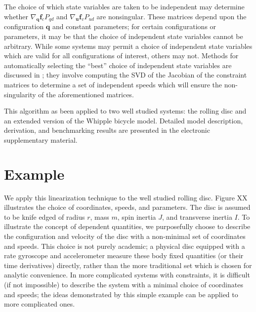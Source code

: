 \documentclass[smallcondensed]{svjour3}                     %
\begin{document}
The choice of which state variables are taken to be independent may determine
whether $\nabla_{\bm{q}}\bm{f}_{c} P_{qd}$ and $\nabla_{\bm{u}} \bm{f}_{v}
P_{ud}$ are nonsingular.  These matrices depend upon the configuration $\bm{q}$
and constant parameters; for certain configurations or parameters, it may be
that the choice of independent state variables cannot be arbitrary.  While some
systems may permit a choice of independent state variables which are valid for
all configurations of interest, others may not.  Methods for automatically
selecting the ``best'' choice of independent state variables are discussed in
\cite{Reckdahl1996}; they involve computing the SVD of the Jacobian of the
constraint matrices to determine a set of independent speeds which will ensure
the non-singularity of the aforementioned matrices.

This algorithm as been applied to two well studied systems: the rolling disc
and an extended version of the Whipple bicycle model\cite{Meijaard2007}.
Detailed model description, derivation, and benchmarking results are presented
in the electronic supplementary material.

\section{Example}
\label{example}
We apply this linearization technique to the well studied rolling disc.  Figure
XX illustrates the choice of coordinates, speeds, and parameters.  The disc is
assumed to be knife edged of radius $r$, mass $m$, spin inertia $J$, and
transverse inertia $I$.  To illustrate the concept of dependent quantities, we
purposefully choose to describe the configuration and velocity of the disc with
a non-minimal set of coordinates and speeds.  This choice is not purely
academic; a physical disc equipped with a rate gyroscope and accelerometer
measure these body fixed quantities (or their time derivatives) directly,
rather than the more traditional set which is chosen for analytic convenience.
In more complicated systems with constraints, it is difficult (if not
impossible) to describe the system with a minimal choice of coordinates and
speeds; the ideas demonstrated by this simple example can be applied to more
complicated ones.
\end{document}
